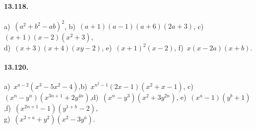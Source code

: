\paragraph{13.118.}
a)~$\left(a^{2}+b^{2}-ab\right)^{2}$,\quad
b)~$(a+1)(a-1)(a+6)(2a+3)$,\quad
c)~$(x+1)(x-2)\left(x^{2}+3\right)$,\protect\\
d)~$(x+3)(x+4)(xy-2)$,\quad 
e)~$(x+1)^{2}(x-2)$,\quad
f)~$x(x-2a)(x+b)$.

\paragraph{13.120.} a)~$x^{a-2}(x^{3}-5x^{2}-4)$,\quad b)~$x^{n^{2}-1}(2x-1)(x^{2}+x-1)$,\quad
c)~$(x^{n}-y^{n})(x^{3n+1}+2y^{4n})$,\quad d)~$(x^{n}-y^{3})(x^{2}+3y^{2n})$,\quad
e)~$(x^{a}-1)(y^{b}+1)$,\quad f)~$(x^{2n+1}-1)(y^{1+h}-2)$,\protect\\
g)~$(x^{2+a}+y^{2})(x^{2}-3y^{a})$.
